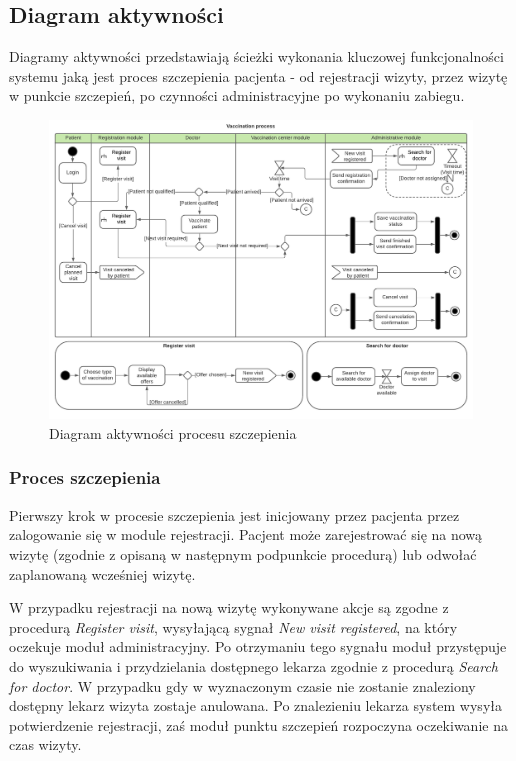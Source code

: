 \documentclass[a4paper,12pt,polish]{article}
\begin{document}
\subsection{Diagram aktywności}
Diagramy aktywności przedstawiają ścieżki wykonania kluczowej funkcjonalności systemu jaką jest proces szczepienia pacjenta - od rejestracji wizyty, przez wizytę w punkcie szczepień, po czynności administracyjne po wykonaniu zabiegu.

\begin{figure}[h]
    \includegraphics[width=\textwidth]{IO1 - diagram aktywnosci.pdf} 
    \caption{Diagram aktywności procesu szczepienia
    \label{fig:diagram-uml}}
\end{figure}

\subsubsection{Proces szczepienia}
Pierwszy krok w procesie szczepienia jest inicjowany przez pacjenta przez zalogowanie się w module rejestracji. Pacjent może zarejestrować się na nową wizytę (zgodnie z opisaną w następnym podpunkcie procedurą) lub odwołać zaplanowaną wcześniej wizytę.

W przypadku rejestracji na nową wizytę wykonywane akcje są zgodne z procedurą \textit{Register visit}, wysyłającą sygnał \textit{New visit registered}, na który oczekuje moduł administracyjny. Po otrzymaniu tego sygnału moduł przystępuje do wyszukiwania i przydzielania dostępnego lekarza zgodnie z procedurą \textit{Search for doctor}. W przypadku gdy w wyznaczonym czasie nie zostanie znaleziony dostępny lekarz wizyta zostaje anulowana. Po znalezieniu lekarza system wysyła potwierdzenie rejestracji, zaś moduł punktu szczepień rozpoczyna oczekiwanie na czas wizyty.
\end{document}
